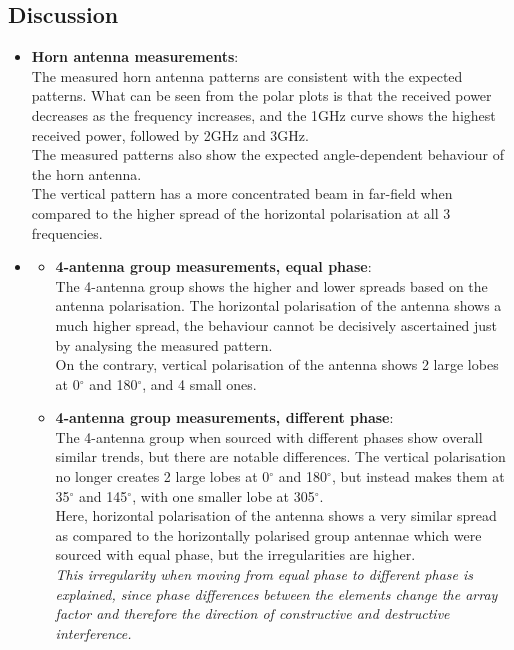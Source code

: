 \FloatBarrier
\subsection{Discussion} 
\begin{itemize}
	\item \textbf{Horn antenna measurements}:\\
	The measured horn antenna patterns are consistent with the expected patterns. What can be seen from the polar plots is that the received power decreases as the frequency increases, and the 1GHz curve shows the highest received power, followed by 2GHz and 3GHz. 
	\\The measured patterns also show the expected angle-dependent behaviour of the horn antenna.\\
	The vertical pattern has a more concentrated beam in far-field when compared to the higher spread of the horizontal polarisation at all 3 frequencies.
	
	\item 
	\begin{itemize}
		\item \textbf{4-antenna group measurements, equal phase}:\\
		The 4-antenna group shows the higher and lower spreads based on the antenna polarisation. The horizontal polarisation of the antenna shows a much higher spread, the behaviour cannot be decisively ascertained just by analysing the measured pattern. \\On the contrary, vertical polarisation of the antenna shows 2 large lobes at 0$^\circ$ and 180$^\circ$, and 4 small ones.
		
		\item \textbf{4-antenna group measurements, different phase}:\\
		The 4-antenna group when sourced with different phases show overall similar trends, but there are notable differences. The vertical polarisation no longer creates 2 large lobes at 0$^\circ$ and 180$^\circ$, but instead makes them at 35$^\circ$ and 145$^\circ$, with one smaller lobe at 305$^\circ$. \\Here, horizontal polarisation of the antenna shows a very similar spread as compared to the horizontally polarised group antennae which were sourced with equal phase, but the irregularities are higher.\\
		
		\textit{This irregularity when moving from equal phase to different phase is explained, since phase differences between the elements change the array factor and therefore the direction of constructive and destructive interference.}
	\end{itemize}
	

\end{itemize}
